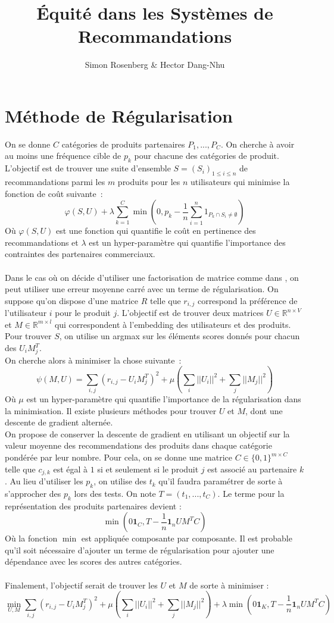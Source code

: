 \documentclass{article}
\title{Équité dans les Systèmes de Recommandations}
\author{Simon Rosenberg \& Hector Dang-Nhu}
\renewcommand{\phi}[0]{\varphi}
\begin{document}
\maketitle

\section{Méthode de Régularisation}

On se donne $C$ catégories de produits partenaires $P_1, ... , P_C$. On cherche à avoir au moins une fréquence cible de $p_k$ pour chacune des catégories de produit. L'objectif est de trouver une suite d'ensemble $S = (S_i)_{1 \leq i \leq n}$ de recommandations parmi les $m$ produits pour les $n$ utilisateurs qui minimise la fonction de coût suivante~:
$$
\phi(S, U)  + \lambda \sum_{k=1}^C\min\left(0, p_k - \frac{1}{n}\sum_{i=1}^{n}1_{P_k\cap S_i\neq \emptyset}\right)
$$
Où $\phi(S,U)$ est une fonction qui quantifie le coût en pertinence des recommandations et $\lambda$ est un hyper-paramètre qui quantifie l'importance des contraintes des partenaires commerciaux.\\
\\
Dans le cas où on décide d'utiliser une factorisation de matrice comme dans \cite{netflixmoney}, on peut utiliser une erreur moyenne carré avec un terme de régularisation. On suppose qu'on dispose d'une matrice $R$ telle que $r_{i,j}$ correspond la préférence de l'utilisateur $i$ pour le produit $j$. L'objectif est de trouver deux matrices $U\in \mathbb{R}^{n\times V}$ et $M\in \mathbb{R}^{m \times l}$ qui correspondent à l'embedding des utilisateurs et des produits. Pour trouver $S$, on utilise un argmax sur les éléments scores donnés pour chacun des $U_iM_j^T$.\\
On cherche alors à minimiser la chose suivante~:
$$
\psi(M, U) = \sum_{i,j} (r_{i,j} - U_iM_j^T)^2 + \mu\left(\sum_i||U_i||^2 + \sum_j||M_j||^2\right)
$$
Où $\mu$ est un hyper-paramètre qui quantifie l'importance de la régularisation dans la minimisation. Il existe plusieurs méthodes pour trouver $U$ et $M$, dont une descente de gradient alternée.\\
On propose de conserver la descente de gradient en utilisant un objectif sur la valeur moyenne des recommendations des produits dans chaque catégorie pondérée par leur nombre. Pour cela, on se donne une matrice $C\in\{0,1\}^{m\times C}$ telle que $c_{j,k}$ est égal à $1$ si et seulement si le produit $j$ est associé au partenaire $k$. Au lieu d'utiliser les $p_k$, on utilise des $t_k$ qu'il faudra paramétrer de sorte à s'approcher des $p_k$ lors des tests. On note $T = ( t_1, ..., t_C)$. Le terme pour la représentation des produits partenaires devient :
$$
\min(0\bm{1}_{C}, T - \frac{1}{n}\bm{1}_{n}UM^TC)
$$
Où la fonction $\min$ est appliquée composante par composante. Il est probable qu'il soit nécessaire d'ajouter un terme de régularisation pour ajouter une dépendance avec les scores des autres catégories. \\
\\
Finalement, l'objectif serait de trouver les $U$ et $M$ de sorte à minimiser :
$$
\min_{U,M}\sum_{i,j} (r_{i,j} - U_iM_j^T)^2 + \mu\left(\sum_i||U_i||^2 + \sum_j||M_j||^2\right) + \lambda \min(0\bm{1}_{K}, T - \frac{1}{n}\bm{1}_{n}UM^TC)
$$
\nocite{toward}
\end{document}
